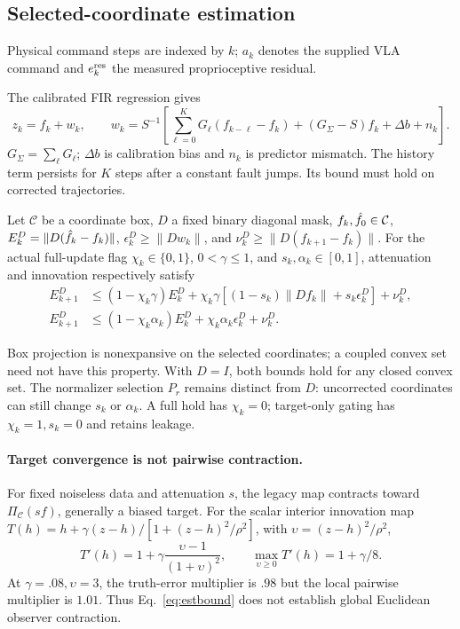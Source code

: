 \subsection{Selected-coordinate estimation}
\label{sec:discrete}
Physical command steps are indexed by $k$; $a_k$ denotes the supplied VLA
command and $e_k^{\rm res}$ the measured proprioceptive residual.

The calibrated FIR regression gives
\begin{equation}
z_k=f_k+w_k,\qquad
w_k=S^{-1}\!\left[\sum_{\ell=0}^{K}G_\ell(f_{k-\ell}-f_k)
 +(G_\Sigma-S)f_k+\Delta b+n_k\right].
\label{eq:main-identification}
\end{equation}
$G_\Sigma=\sum_\ell G_\ell$; $\Delta b$ is calibration bias and $n_k$ is
predictor mismatch. The history term persists for $K$ steps after a constant
fault jumps. Its bound must hold on corrected trajectories.

\begin{proposition}
\label{thm:estimator}
Let $\mathcal C$ be a coordinate box, $D$ a fixed binary diagonal mask,
$f_k,\hat f_0\in\mathcal C$, $E_k^D=\|D(\hat f_k-f_k)\|$,
$\epsilon_k^D\ge\|Dw_k\|$, and $\nu_k^D\ge\|D(f_{k+1}-f_k)\|$.
For the actual full-update flag $\chi_k\in\{0,1\}$, $0<\gamma\le1$,
and $s_k,\alpha_k\in[0,1]$, attenuation and innovation respectively satisfy
\begin{align}
E_{k+1}^D&\le(1-\chi_k\gamma)E_k^D+
\chi_k\gamma[(1-s_k)\|Df_k\|+s_k\epsilon_k^D]+\nu_k^D,
\label{eq:legacybound}\\
E_{k+1}^D&\le(1-\chi_k\alpha_k)E_k^D+
\chi_k\alpha_k\epsilon_k^D+\nu_k^D.
\label{eq:estbound}
\end{align}
\end{proposition}
Box projection is nonexpansive on the selected coordinates; a coupled convex
set need not have this property. With $D=I$, both bounds hold for any closed
convex set. The normalizer selection $P_r$ remains distinct from $D$:
uncorrected coordinates can still change $s_k$ or $\alpha_k$.
A full hold has $\chi_k=0$; target-only gating has $\chi_k=1,s_k=0$ and
retains leakage.

\paragraph{Target convergence is not pairwise contraction.}
For fixed noiseless data and attenuation $s$, the legacy map contracts toward
$\Pi_{\mathcal C}(sf)$, generally a biased target. For the scalar interior
innovation map $T(h)=h+\gamma(z-h)/[1+(z-h)^2/\rho^2]$, with
$\upsilon=(z-h)^2/\rho^2$,
\begin{equation}
T'(h)=1+\gamma\frac{\upsilon-1}{(1+\upsilon)^2},\qquad
\max_{\upsilon\ge0}T'(h)=1+\gamma/8.
\label{eq:innovation-counterexample}
\end{equation}
At $\gamma=.08,\upsilon=3$, the truth-error multiplier is $.98$ but the local
pairwise multiplier is $1.01$. Thus Eq.~\eqref{eq:estbound} does not establish
global Euclidean observer contraction.

